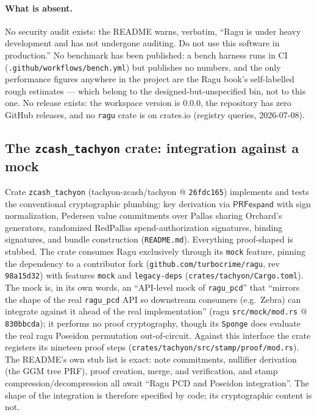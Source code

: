 \documentclass[11pt,a4paper]{article}
\theoremstyle{definition}
\begin{document}
\paragraph{What is absent.}
No security audit exists: the README warns, verbatim, ``Ragu is under heavy
development and has not undergone auditing. Do not use this software in
production.'' No benchmark has been published: a bench harness runs in CI
(\texttt{.github/workflows/bench.yml}) but publishes no numbers, and the
only performance figures anywhere in the project are the Ragu book's
self-labelled rough estimates --- which belong to the
designed-but-unspecified bin, not to this one. No release exists: the
workspace version is 0.0.0, the repository has zero GitHub releases, and no
\texttt{ragu} crate is on crates.io (registry queries, 2026-07-08).

\subsection{The \texttt{zcash\_tachyon} crate: integration against a mock}
\label{sec:tachyon-crate}

Crate \texttt{zcash\_tachyon} (tachyon-zcash/tachyon @ \texttt{26fdc165})
implements and tests the conventional cryptographic plumbing: key derivation
via $\mathsf{PRFexpand}$ with sign normalization, Pedersen value commitments
over Pallas sharing Orchard's generators, randomized RedPallas
spend-authorization signatures, binding signatures, and bundle construction
(\texttt{README.md}). Everything proof-shaped is stubbed. The crate consumes
Ragu exclusively through its \texttt{mock} feature, pinning the dependency
to a contributor fork (\texttt{github.com/turbocrime/ragu}, rev
\texttt{98a15d32}) with features \texttt{mock} and \texttt{legacy-deps}
(\texttt{crates/tachyon/Cargo.toml}). The mock is, in its own words, an
``API-level mock of \texttt{ragu\_pcd}'' that ``mirrors the shape of the
real \texttt{ragu\_pcd} API so downstream consumers (e.g.\ Zebra) can
integrate against it ahead of the real implementation'' (ragu
\texttt{src/mock/mod.rs} @ \texttt{830bbcda}); it performs no proof
cryptography, though its \texttt{Sponge} does evaluate the real ragu
Poseidon permutation out-of-circuit.
Against this interface the crate registers its nineteen proof steps
(\texttt{crates/tachyon/src/stamp/proof/mod.rs}). The README's own stub
list is exact: note commitments, nullifier derivation (the GGM tree PRF),
proof creation, merge, and verification, and stamp
compression/decompression all await ``Ragu PCD and Poseidon integration''.
The shape of the integration is therefore specified by code; its
cryptographic content is not.
\end{document}
